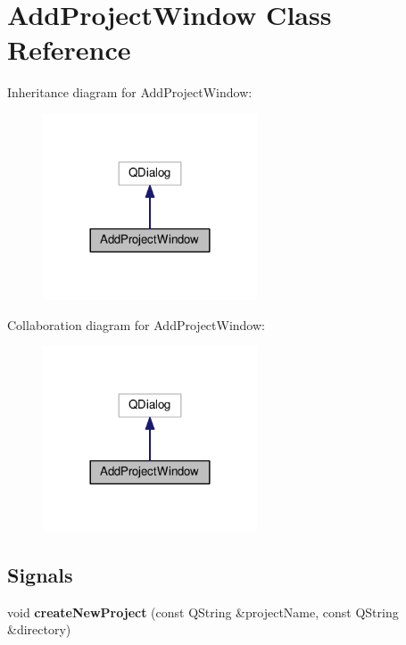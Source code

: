 \hypertarget{class_add_project_window}{}\section{Add\+Project\+Window Class Reference}
\label{class_add_project_window}


Inheritance diagram for Add\+Project\+Window\+:
\nopagebreak
\begin{figure}[H]
\begin{center}
\leavevmode
\includegraphics[width=180pt]{class_add_project_window__inherit__graph}
\end{center}
\end{figure}


Collaboration diagram for Add\+Project\+Window\+:
\nopagebreak
\begin{figure}[H]
\begin{center}
\leavevmode
\includegraphics[width=180pt]{class_add_project_window__coll__graph}
\end{center}
\end{figure}
\subsection*{Signals}
\begin{DoxyCompactItemize}
\item 
void {\bfseries create\+New\+Project} (const Q\+String \&project\+Name, const Q\+String \&directory)\hypertarget{class_add_project_window_a547c205329ab94a9b3d7d973e6978030}{}\label{class_add_project_window_a547c205329ab94a9b3d7d973e6978030}

\end{DoxyCompactItemize}
